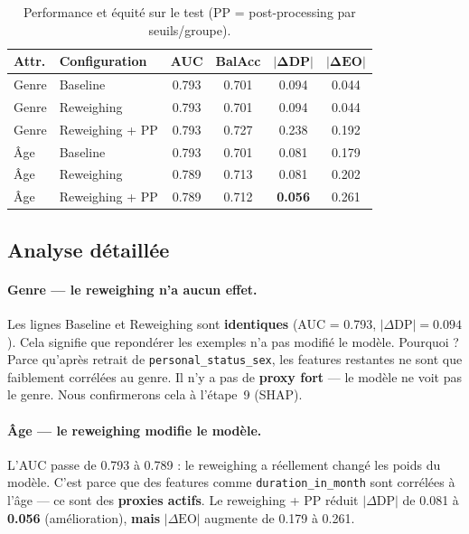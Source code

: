 \documentclass[11pt, a4paper]{article}
\begin{document}
\begin{table}[H]
\centering
\small
\begin{tabular}{llcccc}
\toprule
\textbf{Attr.} & \textbf{Configuration} & \textbf{AUC} & \textbf{BalAcc} & $\boldsymbol{|\Delta\textbf{DP}|}$ & $\boldsymbol{|\Delta\textbf{EO}|}$ \\
\midrule
\rowcolor{accent!5}
Genre & Baseline          & 0.793 & 0.701 & 0.094 & 0.044 \\
\rowcolor{accent!5}
Genre & Reweighing        & 0.793 & 0.701 & 0.094 & 0.044 \\
\rowcolor{accent!10}
Genre & Reweighing + PP   & 0.793 & 0.727 & 0.238 & 0.192 \\
\midrule
\rowcolor{fair!5}
\^{A}ge  & Baseline          & 0.793 & 0.701 & 0.081 & 0.179 \\
\rowcolor{fair!5}
\^{A}ge  & Reweighing        & 0.789 & 0.713 & 0.081 & 0.202 \\
\rowcolor{fair!10}
\^{A}ge  & Reweighing + PP   & 0.789 & 0.712 & \textbf{0.056} & 0.261 \\
\bottomrule
\end{tabular}
\caption{Performance et \'{e}quit\'{e} sur le test (PP = post-processing par seuils/groupe).}
\label{tab:comparison}
\end{table}

\subsection{Analyse d\'{e}taill\'{e}e}

\paragraph{Genre --- le reweighing n'a aucun effet.}
Les lignes Baseline et Reweighing sont \textbf{identiques} (AUC = 0.793, $|\Delta\text{DP}| = 0.094$). Cela signifie que repondérer les exemples n'a pas modifi\'{e} le mod\`{e}le. Pourquoi ? Parce qu'apr\`{e}s retrait de \texttt{personal\_status\_sex}, les features restantes ne sont que faiblement corr\'{e}l\'{e}es au genre. Il n'y a pas de \textbf{proxy fort} --- le mod\`{e}le ne \og voit \fg{} pas le genre. Nous confirmerons cela \`{a} l'\'{e}tape~9 (SHAP).

\paragraph{\^{A}ge --- le reweighing modifie le mod\`{e}le.}
L'AUC passe de 0.793 \`{a} 0.789 : le reweighing a r\'{e}ellement chang\'{e} les poids du mod\`{e}le. C'est parce que des features comme \texttt{duration\_in\_month} sont corr\'{e}l\'{e}es \`{a} l'\^{a}ge --- ce sont des \textbf{proxies actifs}. Le reweighing + PP r\'{e}duit $|\Delta\text{DP}|$ de 0.081 \`{a} \textbf{0.056} (am\'{e}lioration), \textbf{mais} $|\Delta\text{EO}|$ augmente de 0.179 \`{a} 0.261.
\end{document}

